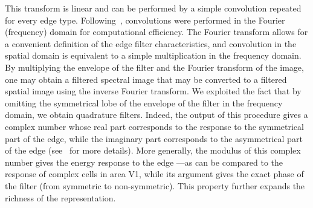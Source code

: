 \documentclass[a4paper, 11pt]{book}
\begin{document}
This transform is linear and can be performed by a simple convolution
repeated for every edge type.
Following~\citet{Fischer07cv}, convolutions were performed in the Fourier (frequency) domain
for computational efficiency.
The Fourier transform allows for a convenient definition of the edge filter characteristics,
and convolution in the spatial domain is equivalent to a simple multiplication in the frequency domain.
By multiplying the envelope of the filter and the Fourier transform of the image,
one may obtain a filtered spectral image that may be converted to
a filtered spatial image using the inverse Fourier transform.
We exploited the fact that by omitting the symmetrical lobe of the envelope of the filter
in the frequency domain,
we obtain quadrature filters.
Indeed, the output of this procedure gives a complex number whose
real part corresponds to the response to the symmetrical part of the edge,
while the imaginary part corresponds to the asymmetrical part of the edge
(see~\citet{Fischer07cv} for more details).
More generally, the modulus of this complex number gives the energy response
to the edge ---as can be compared to the response of complex cells in area V1,
while its argument gives the exact phase of the filter (from symmetric to non-symmetric).
This property further expands the richness of the representation.
\end{document}

